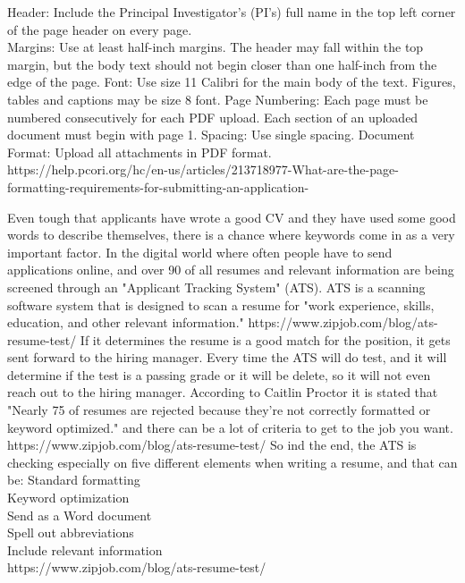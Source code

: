 Header: Include the Principal Investigator’s (PI’s) full name in the top left corner of the page header on every page. \\
Margins: Use at least half-inch margins. The header may fall within the top margin, but the body text should not begin closer than one half-inch from the edge of the page.
Font: Use size 11 Calibri for the main body of the text. Figures, tables and captions may be size 8 font.
Page Numbering: Each page must be numbered consecutively for each PDF upload. Each section of an uploaded document must begin with page 1.
Spacing: Use single spacing.
Document Format: Upload all attachments in PDF format. \\
https://help.pcori.org/hc/en-us/articles/213718977-What-are-the-page-formatting-requirements-for-submitting-an-application-

Even tough that applicants have wrote a good CV and they have used some good words to describe themselves, 
there is a chance where keywords come in as a very important factor. In the digital world where often people have to send applications online, and over 90 %
of all resumes and relevant information are being screened through an "Applicant Tracking System" (ATS). ATS is a scanning software system 
that is designed to scan a resume for "work experience, skills, education, and other relevant information." https://www.zipjob.com/blog/ats-resume-test/
If it determines the resume is a good match for the position, it gets sent forward to the hiring manager. 
Every time the ATS will do test, and it will determine if the test is a passing grade or it will be delete, so it will not even reach out to the hiring manager. 
According to Caitlin Proctor it is stated that "Nearly 75 %
of resumes are rejected because they’re not correctly formatted or keyword optimized." and there can be a lot of criteria 
to get to the job you want. https://www.zipjob.com/blog/ats-resume-test/
So ind the end, the ATS is checking especially on five different elements when writing a resume, and that can be:
Standard formatting \\
Keyword optimization \\
Send as a Word document \\
Spell out abbreviations \\
Include relevant information \\
https://www.zipjob.com/blog/ats-resume-test/


